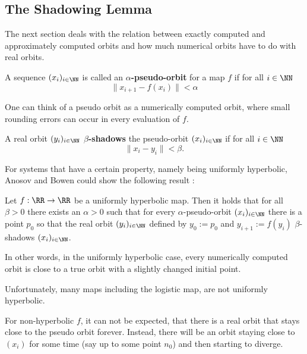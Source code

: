   \subsection{The Shadowing Lemma}
    The next section deals with the relation between exactly computed and approximately computed orbits and how much numerical orbits have to do with real orbits. 
    \begin{definition}\label{def:pseudoorbit}
      A sequence $(x_i)_{i \in \NN}$ is called an \textbf{$\alpha$-pseudo-orbit} for a map $f$ if for all $i \in \NN$
      $$ \| x_{i+1} - f(x_i) \| < \alpha $$  
    \end{definition}
    One can think of a pseudo orbit as a numerically computed orbit, where small rounding errors can occur in every evaluation of $f$.
    \begin{definition}\label{def:shadowing}
      A real orbit $(y_i)_{i \in \NN}$ \textbf{$\beta$-shadows} the pseudo-orbit $(x_i)_{i \in \NN}$ if for all $i \in \NN$
      $$\| x_i - y_i \| < \beta.$$  
    \end{definition}
    For systems that have a certain property, namely being uniformly
    hyperbolic, Anosov and Bowen could show the following result \cite{anosov1967} \cite{Bowen1975} \cite{Hasselblatt:2008}:
    \begin{theorem}
     Let $f: \RR \to \RR$ be a uniformly hyperbolic map.
     Then it holds that for all $\beta > 0$ there exists an $\alpha > 0$ such that for every $\alpha$-pseudo-orbit $(x_i)_{i \in \NN}$
     there is a point $p_0$ so that the real orbit $(y_i)_{i \in \NN}$ defined by $y_0 := p_0$ and $y_{i+1} := f(y_i)$ $\beta$-shadows $(x_i)_{i \in \NN}$.
    \end{theorem} 
    In other words, in the uniformly hyperbolic case, every numerically computed orbit is close to a true orbit with a slightly changed initial point.

    Unfortunately, many maps including the logistic map, are not uniformly hyperbolic. 

    For non-hyperbolic $f$, it can not be expected, that there is a real orbit that stays close to the pseudo orbit forever.
    Instead, there will be an orbit staying close to $(x_i)$ for some time (say up to some point $n_0$) and then starting to diverge. 

